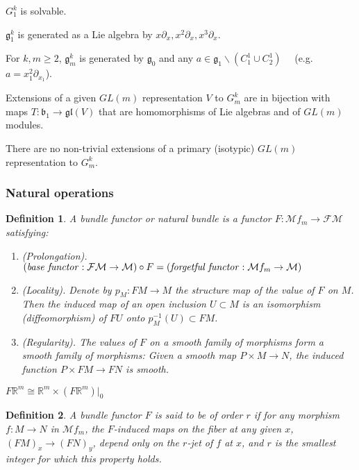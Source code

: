 \documentclass[12pt]{article}
\numberwithin{equation}{section}
\theoremstyle{plain}
\newtheorem{definition}{Definition}[section]
\theoremstyle{definition}
\newcommand{\R}{\mathbb{R}}
\newcommand{\M}{\mathcal{M}}
\newcommand{\ra}{\rightarrow}
\begin{document}
$G^{k}_{1}$ is solvable.

$\mathfrak{g}^{k}_{1}$ is generated as a Lie algebra by $x\partial_{x},x^{2}\partial_{x},x^{3}\partial_{x}$.

For $k,m\geq 2$, $\mathfrak{g}^{k}_{m}$ is generated by $\mathfrak{g}_{0}$ and any $a\in \mathfrak{g}_{1}\backslash (C^{1}_{1}\cup C^{1}_{2})\quad$ (e.g. $a=x_{1}^{2}\partial_{x_{1}}$).

Extensions of a given $GL(m)$ representation $V$ to $G^{k}_{m}$ are in bijection with maps $T:\mathfrak{b}_{1}\ra \mathfrak{gl}(V)$ that are homomorphisms of Lie algebras and of $GL(m)$ modules.

There are no non-trivial extensions of a primary (isotypic) $GL(m)$ representation to $G^{k}_{m}$.

\subsubsection{Natural operations}

\begin{definition}\label{bundlefunc} A \emph{bundle functor} or \emph{natural bundle} is a functor $F:\mathcal{M}f_{m}\ra \mathcal{FM}$ satisfying:
\begin{enumerate}
\itemsep0em
\item{\emph{(Prolongation).} $(\text{\emph{base functor}}:\mathcal{FM}\ra \M)\circ F = (\text{\emph{forgetful functor}}:\mathcal{M}f_m\ra \M)$}
\item{\emph{(Locality).} Denote by $p_{M}:FM\ra M$ the structure map of the value of $F$ on $M$. Then the induced map of an open inclusion $U\subset M$ is an isomorphism (diffeomorphism) of $FU$ onto $p_M^{-1}(U)\subset FM$.}
\item{\label{regularity}\emph{(Regularity).} The values of $F$ on a smooth family of morphisms form a smooth family of morphisms: Given a smooth map $P\times M\ra N$, the induced function $P\times FM\ra FN$ is smooth.}
\end{enumerate}
\end{definition}

$F\R^{m}\cong \R^{m}\times (F\R^{m})|_{0}$

\begin{definition} A bundle functor $F$ is said to be \emph{of order $r$} if for any morphism $f:M\ra N$ in $\mathcal{M}f_{m}$, the $F$-induced maps on the fiber at any given $x$, $(FM)_{x}\ra (FN)_{y}$, depend only on the $r$-jet of $f$ at $x$, and $r$ is the smallest integer for which this property holds.
\end{definition}
\end{document}
